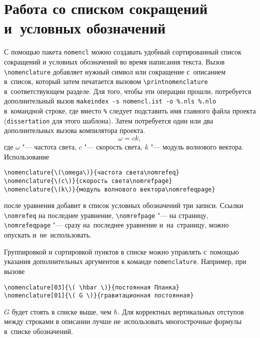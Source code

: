 \begin{comment}
Этот текст всегда скрыт.
\end{comment}

\section{Работа со списком сокращений и~условных обозначений}\label{sec:acronyms}

С помощью пакета \texttt{nomencl} можно создавать удобный сортированный список
сокращений и условных обозначений во время написания текста. Вызов
\verb+\nomenclature+ добавляет нужный символ или сокращение с~описанием
в~список, который затем печатается вызовом \verb+\printnomenclature+
в~соответствующем разделе.
Для того, чтобы эти операции прошли, потребуется дополнительный вызов
\verb+makeindex -s nomencl.ist -o %.nls %.nlo+ в~командной строке, где вместо
\verb+%+ следует подставить имя главного файла проекта (\verb+dissertation+
для этого шаблона).
Затем потребуется один или два дополнительных вызова компилятора проекта.
\begin{equation}
    \omega = c k,
\end{equation}
где \( \omega \) "--- частота света, \( c \) "--- скорость света, \( k \) "---
модуль волнового вектора.
Использование
\begin{verbatim}
\nomenclature{\(\omega\)}{частота света\nomrefeq}
\nomenclature{\(c\)}{скорость света\nomrefpage}
\nomenclature{\(k\)}{модуль волнового вектора\nomrefeqpage}
\end{verbatim}
после уравнения добавит в список условных обозначений три записи.
Ссылки \verb+\nomrefeq+ на последнее уравнение, \verb+\nomrefpage+ "--- на
страницу, \verb+\nomrefeqpage+ "--- сразу на~последнее уравнение и~на~страницу,
можно опускать и~не~использовать.

Группировкой и сортировкой пунктов в списке можно управлять с~помощью указания
дополнительных аргументов к команде \verb+nomenclature+.
Например, при вызове
\begin{verbatim}
\nomenclature[03]{\( \hbar \)}{постоянная Планка}
\nomenclature[01]{\( G \)}{гравитационная постоянная}
\end{verbatim}
\( G \) будет стоять в списке выше, чем \( \hbar \).
Для корректных вертикальных отступов между строками в описании лучше
не~использовать многострочные формулы в~списке обозначений.

